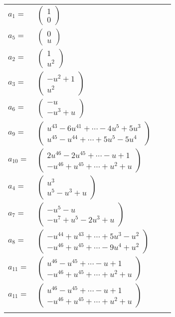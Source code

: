 \documentclass[1p]{elsarticle_modified}
\theoremstyle{definition}
\begin{document}
\begin{tabular}{m{7pt} m{180pt} m{7pt} m{180pt} }
\flushright $a_{1}=$&$\begin{pmatrix}1\\0\end{pmatrix}$ \\
\flushright $a_{5}=$&$\begin{pmatrix}0\\u\end{pmatrix}$ \\
\flushright $a_{2}=$&$\begin{pmatrix}1\\u^2\end{pmatrix}$ \\
\flushright $a_{3}=$&$\begin{pmatrix}- u^2+1\\u^2\end{pmatrix}$ \\
\flushright $a_{6}=$&$\begin{pmatrix}- u\\- u^3+u\end{pmatrix}$ \\
\flushright $a_{9}=$&$\begin{pmatrix}u^{43}-6 u^{41}+\cdots-4 u^5+5 u^3\\u^{45}- u^{44}+\cdots+5 u^5-5 u^4\end{pmatrix}$ \\
\flushright $a_{10}=$&$\begin{pmatrix}2 u^{46}-2 u^{45}+\cdots- u+1\\- u^{46}+u^{45}+\cdots+u^2+u\end{pmatrix}$ \\
\flushright $a_{4}=$&$\begin{pmatrix}u^3\\u^5- u^3+u\end{pmatrix}$ \\
\flushright $a_{7}=$&$\begin{pmatrix}- u^5- u\\- u^7+u^5-2 u^3+u\end{pmatrix}$ \\
\flushright $a_{8}=$&$\begin{pmatrix}- u^{44}+u^{43}+\cdots+5 u^3- u^2\\- u^{46}+u^{45}+\cdots-9 u^4+u^2\end{pmatrix}$ \\
\flushright $a_{11}=$&$\begin{pmatrix}u^{46}- u^{45}+\cdots- u+1\\- u^{46}+u^{45}+\cdots+u^2+u\end{pmatrix}$\\ \flushright $a_{11}=$&$\begin{pmatrix}u^{46}- u^{45}+\cdots- u+1\\- u^{46}+u^{45}+\cdots+u^2+u\end{pmatrix}$\\&\end{tabular}
\end{document}
